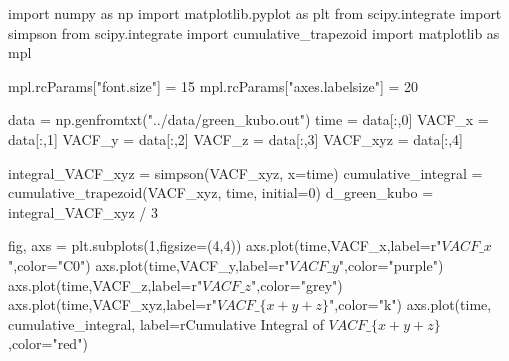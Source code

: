 \documentclass[
  letterpaper,
]{article}
\newenvironment{Shaded}{\begin{snugshade}}{\end{snugshade}}
\newcommand{\DecValTok}[1]{\textcolor[rgb]{0.68,0.00,0.00}{#1}}
\newcommand{\ImportTok}[1]{\textcolor[rgb]{0.00,0.46,0.62}{#1}}
\newcommand{\NormalTok}[1]{\textcolor[rgb]{0.00,0.23,0.31}{#1}}
\newcommand{\OperatorTok}[1]{\textcolor[rgb]{0.37,0.37,0.37}{#1}}
\newcommand{\StringTok}[1]{\textcolor[rgb]{0.13,0.47,0.30}{#1}}
\newcommand{\VerbatimStringTok}[1]{\textcolor[rgb]{0.13,0.47,0.30}{#1}}
\begin{document}
\begin{Shaded}
\begin{Highlighting}[]
\ImportTok{import}\NormalTok{ numpy }\ImportTok{as}\NormalTok{ np}
\ImportTok{import}\NormalTok{ matplotlib.pyplot }\ImportTok{as}\NormalTok{ plt}
\ImportTok{from}\NormalTok{ scipy.integrate }\ImportTok{import}\NormalTok{ simpson}
\ImportTok{from}\NormalTok{ scipy.integrate }\ImportTok{import}\NormalTok{ cumulative\_trapezoid}
\ImportTok{import}\NormalTok{ matplotlib }\ImportTok{as}\NormalTok{ mpl}

\NormalTok{mpl.rcParams[}\StringTok{"font.size"}\NormalTok{] }\OperatorTok{=} \DecValTok{15}
\NormalTok{mpl.rcParams[}\StringTok{"axes.labelsize"}\NormalTok{] }\OperatorTok{=} \DecValTok{20}

\NormalTok{data }\OperatorTok{=}\NormalTok{ np.genfromtxt(}\StringTok{"../data/green\_kubo.out"}\NormalTok{)}
\NormalTok{time }\OperatorTok{=}\NormalTok{ data[:,}\DecValTok{0}\NormalTok{]}
\NormalTok{VACF\_x }\OperatorTok{=}\NormalTok{ data[:,}\DecValTok{1}\NormalTok{]}
\NormalTok{VACF\_y }\OperatorTok{=}\NormalTok{ data[:,}\DecValTok{2}\NormalTok{]}
\NormalTok{VACF\_z }\OperatorTok{=}\NormalTok{ data[:,}\DecValTok{3}\NormalTok{]}
\NormalTok{VACF\_xyz }\OperatorTok{=}\NormalTok{ data[:,}\DecValTok{4}\NormalTok{]}


\NormalTok{integral\_VACF\_xyz }\OperatorTok{=}\NormalTok{ simpson(VACF\_xyz, x}\OperatorTok{=}\NormalTok{time)}
\NormalTok{cumulative\_integral }\OperatorTok{=}\NormalTok{ cumulative\_trapezoid(VACF\_xyz, time, initial}\OperatorTok{=}\DecValTok{0}\NormalTok{)}
\NormalTok{d\_green\_kubo }\OperatorTok{=}\NormalTok{ integral\_VACF\_xyz }\OperatorTok{/} \DecValTok{3}

\NormalTok{fig, axs }\OperatorTok{=}\NormalTok{ plt.subplots(}\DecValTok{1}\NormalTok{,figsize}\OperatorTok{=}\NormalTok{(}\DecValTok{4}\NormalTok{,}\DecValTok{4}\NormalTok{))}
\NormalTok{axs.plot(time,VACF\_x,label}\OperatorTok{=}\VerbatimStringTok{r"$VACF\_x$"}\NormalTok{,color}\OperatorTok{=}\StringTok{"C0"}\NormalTok{)}
\NormalTok{axs.plot(time,VACF\_y,label}\OperatorTok{=}\VerbatimStringTok{r"$VACF\_y$"}\NormalTok{,color}\OperatorTok{=}\StringTok{"purple"}\NormalTok{)}
\NormalTok{axs.plot(time,VACF\_z,label}\OperatorTok{=}\VerbatimStringTok{r"$VACF\_z$"}\NormalTok{,color}\OperatorTok{=}\StringTok{"grey"}\NormalTok{)}
\NormalTok{axs.plot(time,VACF\_xyz,label}\OperatorTok{=}\VerbatimStringTok{r"$VACF\_\{x+y+z\}$"}\NormalTok{,color}\OperatorTok{=}\StringTok{"k"}\NormalTok{)}
\NormalTok{axs.plot(time, cumulative\_integral, label}\OperatorTok{=}\VerbatimStringTok{r\textquotesingle{}Cumulative Integral of $VACF\_\{x+y+z\}$\textquotesingle{}}\NormalTok{,color}\OperatorTok{=}\StringTok{"red"}\NormalTok{)}


\end{Highlighting}
\end{Shaded}
\end{document}
